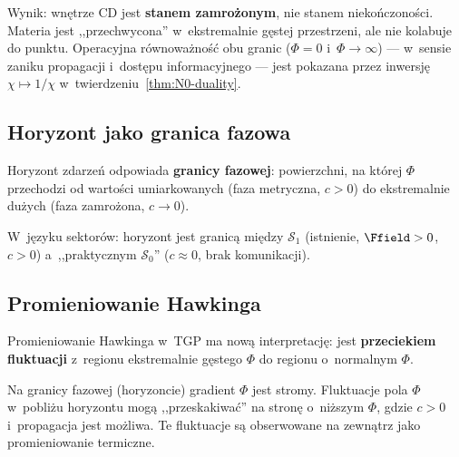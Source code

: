 Wynik: wn\k{e}trze CD jest \textbf{stanem zamro\.zonym}, nie
stanem nieko\'nczono\'sci. Materia jest ,,przechwycona'' w~ekstremalnie
g\k{e}stej przestrzeni, ale nie kolabuje do punktu.
Operacyjna r\'ownowa\.zno\'s\'c obu granic ($\Phi = 0$
i~$\Phi \to \infty$) --- w~sensie zaniku propagacji
i~dost\k{e}pu informacyjnego --- jest pokazana przez
inwersj\k{e} $\chi \mapsto 1/\chi$
w~twierdzeniu~\ref{thm:N0-duality}.

\subsection{Horyzont jako granica fazowa}\label{ssec:cd-horyzont}

Horyzont zdarze\'n odpowiada \textbf{granicy fazowej}: powierzchni,
na kt\'orej $\Phi$ przechodzi od warto\'sci umiarkowanych
(faza metryczna, $c > 0$) do ekstremalnie du\.zych
(faza zamro\.zona, $c \to 0$).

W~j\k{e}zyku sektor\'ow: horyzont jest granic\k{a} mi\k{e}dzy
$\mathcal{S}_1$ (istnienie, $\Ffield > 0$, $c > 0$)
a~,,praktycznym $\mathcal{S}_0$'' ($c \approx 0$, brak
komunikacji).

\subsection{Promieniowanie Hawkinga}\label{ssec:cd-hawking}

Promieniowanie Hawkinga w~TGP ma now\k{a} interpretacj\k{e}:
jest \textbf{przeciekiem fluktuacji} z~regionu ekstremalnie
g\k{e}stego $\Phi$ do regionu o~normalnym $\Phi$.

Na granicy fazowej (horyzoncie) gradient $\Phi$ jest stromy.
Fluktuacje pola $\Phi$ w~pobli\.zu horyzontu mog\k{a}
,,przeskakiwa\'c'' na stron\k{e} o~ni\.zszym $\Phi$, gdzie $c > 0$
i~propagacja jest mo\.zliwa. Te fluktuacje s\k{a} obserwowane
na zewn\k{a}trz jako promieniowanie termiczne.

